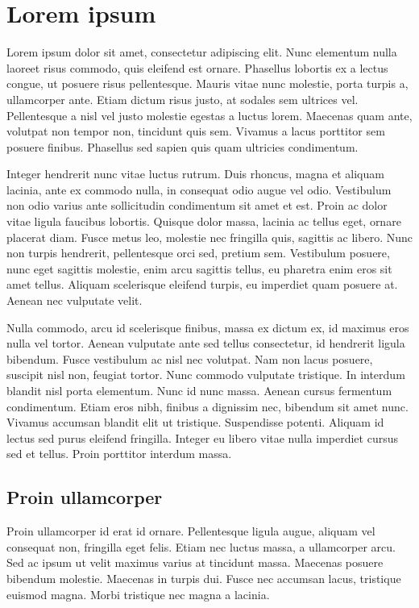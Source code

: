 \documentclass[twoside,openright,a4paper,11pt,french]{article}
\begin{document}
\section{Lorem ipsum}

Lorem ipsum dolor sit amet, consectetur adipiscing elit. Nunc elementum nulla laoreet risus commodo, quis eleifend est ornare. Phasellus lobortis ex a lectus congue, ut posuere risus pellentesque. Mauris vitae nunc molestie, porta turpis a, ullamcorper ante. Etiam dictum risus justo, at sodales sem ultrices vel. Pellentesque a nisl vel justo molestie egestas a luctus lorem. Maecenas quam ante, volutpat non tempor non, tincidunt quis sem. Vivamus a lacus porttitor sem posuere finibus. Phasellus sed sapien quis quam ultricies condimentum.

Integer hendrerit nunc vitae luctus rutrum. Duis rhoncus, magna et aliquam lacinia, ante ex commodo nulla, in consequat odio augue vel odio. Vestibulum non odio varius ante sollicitudin condimentum sit amet et est. Proin ac dolor vitae ligula faucibus lobortis. Quisque dolor massa, lacinia ac tellus eget, ornare placerat diam. Fusce metus leo, molestie nec fringilla quis, sagittis ac libero. Nunc non turpis hendrerit, pellentesque orci sed, pretium sem. Vestibulum posuere, nunc eget sagittis molestie, enim arcu sagittis tellus, eu pharetra enim eros sit amet tellus. Aliquam scelerisque eleifend turpis, eu imperdiet quam posuere at. Aenean nec vulputate velit.

Nulla commodo, arcu id scelerisque finibus, massa ex dictum ex, id maximus eros nulla vel tortor. Aenean vulputate ante sed tellus consectetur, id hendrerit ligula bibendum. Fusce vestibulum ac nisl nec volutpat. Nam non lacus posuere, suscipit nisl non, feugiat tortor. Nunc commodo vulputate tristique. In interdum blandit nisl porta elementum. Nunc id nunc massa. Aenean cursus fermentum condimentum. Etiam eros nibh, finibus a dignissim nec, bibendum sit amet nunc. Vivamus accumsan blandit elit ut tristique. Suspendisse potenti. Aliquam id lectus sed purus eleifend fringilla. Integer eu libero vitae nulla imperdiet cursus sed et tellus. Proin porttitor interdum massa.

\subsection{Proin ullamcorper}

Proin ullamcorper id erat id ornare. Pellentesque ligula augue, aliquam vel consequat non, fringilla eget felis. Etiam nec luctus massa, a ullamcorper arcu. Sed ac ipsum ut velit maximus varius at tincidunt massa. Maecenas posuere bibendum molestie. Maecenas in turpis dui. Fusce nec accumsan lacus, tristique euismod magna. Morbi tristique nec magna a lacinia.
\end{document}
